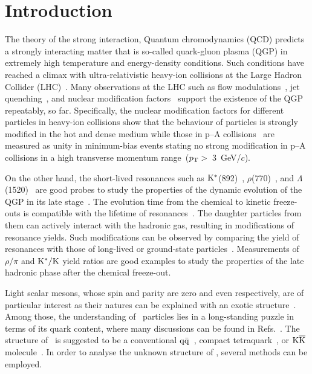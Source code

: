 
\section{Introduction}

The theory of the strong interaction, Quantum chromodynamics (QCD) predicts a strongly interacting matter that is so-called quark-gluon plasma (QGP) in extremely high temperature and energy-density conditions. Such conditions have reached a climax  with ultra-relativistic heavy-ion collisions at the Large Hadron Collider (LHC)~\cite{Wolschin:2020qxa}. Many observations at the LHC such as flow modulations~\cite{Bhalerao:2020ulk, ALICE:2019zfl}, jet quenching~\cite{ALICE:2019qyj}, and nuclear modification factors~\cite{ALICE:2019hno} support the existence of the QGP~\cite{Adams:2005dq} repeatably, so far. 
Specifically, the nuclear modification factors for different particles in heavy-ion collisions show that the behaviour of particles is strongly modified in the hot and dense medium while those in p--A collisions~\cite{ALICE:2016dei} are measured as unity in minimum-bias events stating no strong modification in p--A collisions in a  high transverse momentum range~($p_{\rm{T}}>$~3~GeV/$c$). 

On the other hand, the short-lived resonances such as $\rm{}K^{*}$(892)~\cite{ALICE:2019etb, ALICE:2016sak}, $\rho$(770)~\cite{ALICE:2018qdv}, and $\Lambda$(1520)~\cite{ALICE:2018ewo} are good probes to study the properties of the dynamic evolution of the QGP in its late stage~\cite{Bierlich:2021poz}. The evolution time from the chemical to kinetic freeze-outs is compatible with the lifetime of resonances~\cite{ALICE:2011dyt, ALICE:2019xyr}. The daughter particles from them can actively interact with the hadronic gas, resulting in modifications of resonance yields. Such modifications can be observed by comparing the yield of resonances with those of long-lived or ground-state particles~\cite{ALICE:2018pal}. Measurements of $\rho/\pi$ and $\rm{}K^{*}/K$ yield ratios are good examples to study the properties of the late hadronic phase after the chemical freeze-out.

Light scalar mesons, whose spin and parity are zero and even respectively, are of particular interest as their natures can be explained with an exotic structure~\cite{ParticleDataGroup:2020ssz}. Among those, the understanding of \fzero\ particles lies in a long-standing puzzle in terms of its quark content, where many discussions can be found in Refs.~\cite{ExHIC:2010gcb, Jaffe:1976ig, Maiani:2004uc}. The structure of \fzero\ is suggested to be a conventional $\rm{}q\bar{q}$~\cite{Chen:2003za}, compact tetraquark~\cite{Achasov:2020aun}, or $\rm{}K\overline{K}$ molecule~\cite{Ahmed:2020kmp}. In order to analyse the unknown structure of \fzero, several methods can be employed. 

